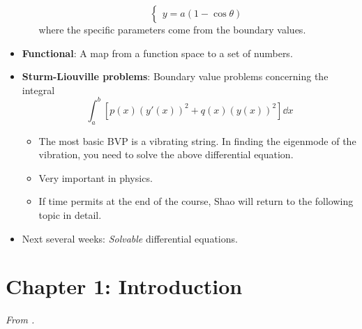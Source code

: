 \documentclass[../notes.tex]{subfiles}
\begin{document}
\begin{itemize}
\begin{itemize}
\begin{equation*}
\begin{cases}
                y = a(1-\cos\theta)
            \end{cases}
        \end{equation*}
        where the specific parameters come from the boundary values.
    \end{itemize}
    \item \textbf{Functional}: A map from a function space to a set of numbers.
    \item \textbf{Sturm-Liouville problems}: Boundary value problems concerning the integral
    \begin{equation*}
        \int_a^b\left[ p(x)(y'(x))^2+q(x)(y(x))^2 \right]\dd{x}
    \end{equation*}
    \begin{itemize}
        \item The most basic BVP is a vibrating string. In finding the eigenmode of the vibration, you need to solve the above differential equation.
        \item Very important in physics.
        \item If time permits at the end of the course, Shao will return to the following topic in detail.
    \end{itemize}
    \item Next several weeks: \emph{Solvable} differential equations.
\end{itemize}



\section{Chapter 1: Introduction}
\emph{From \textcite{bib:Teschl}.}
\end{document}
